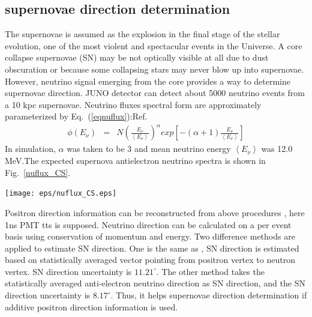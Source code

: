 \documentclass[a4paper,10pt]{cpc-hepnp}
\begin{document}
\subsection{supernovae direction determination }
The supernovae is assumed as the explosion in the final stage of the stellar evolution, one of the most violent and spectacular
events in the Universe. A core collapse supernovae (SN) may be not optically visible at all due to dust obscuration or because
some collapsing stars may never blow up into supernovae. However, neutrino signal emerging from the core provides a way to
determine supernovae direction. JUNO detector can detect about 5000 neutrino events from a 10 kpc supernovae.
Neutrino fluxes spectral form are approximately parameterized by Eq.~(\ref{eqnuflux}):Ref\cite{nuflux}.
\begin{eqnarray}
\label{eqnuflux}
\phi(E_{\nu}) &=& N\left(\frac{E_{\nu}}{ \left< E_{\nu}\right>}\right)^{\alpha}exp\left[ -(\alpha+1)\frac{E_{\nu}}{ \left< E_{\nu}\right>}\right]
\end{eqnarray}
In simulation, $\alpha$ was taken to be 3 and mean neutrino energy $\left< E_{\nu}\right>$ was 12.0 MeV.The expected supernova
antielectron neutrino spectra is shown in Fig.~\ref{nuflux_CS}.
\begin{center}
\texttt{[image: eps/nuflux\_CS.eps]}
\end{center}

Positron direction information can be reconstructed from above procedures , here 1ns PMT tts is supposed.
Neutrino direction can be calculated on a per event basis using conservation of momentum and energy.
Two difference methods are applied to estimate SN direction. One is the same as \cite{nudir},
SN direction is estimated based on statistically averaged vector pointing from positron vertex to neutron vertex.
SN direction uncertainty is $11.21^{\circ}$. The other method takes the statistically averaged
anti-electron neutrino direction as SN direction, and the SN direction uncertainty is $8.17^{\circ}$.
Thus, it helps supernovae direction determination if additive positron direction information is used.
\end{document}
